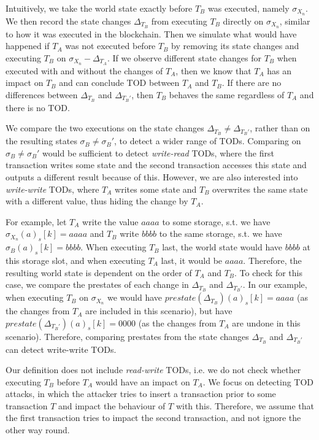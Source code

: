 \documentclass[draft,final]{vutinfth} %
\begin{document}
Intuitively, we take the world state exactly before $T_B$ was executed, namely $\sigma_{X_n}$. We then record the state changes $\Delta_{T_B}$ from executing $T_B$ directly on $\sigma_{X_n}$, similar to how it was executed in the blockchain. Then we simulate what would have happened if $T_A$ was not executed before $T_B$ by removing its state changes and executing $T_B$ on $\sigma_{X_n} - \Delta_{T_A}$. If we observe different state changes for $T_B$ when executed with and without the changes of $T_A$, then we know that $T_A$ has an impact on $T_B$ and can conclude TOD between $T_A$ and $T_B$. If there are no differences between $\Delta_{T_B}$ and $\Delta_{T_B\prime}$, then $T_B$ behaves the same regardless of $T_A$ and there is no TOD.

We compare the two executions on the state changes $\Delta_{T_B} \neq \Delta_{T_B\prime}$, rather than on the resulting states $\sigma_B \neq \sigma_B\prime$, to detect a wider range of TODs. Comparing on $\sigma_B \neq \sigma_B\prime$ would be sufficient to detect \emph{write-read} TODs, where the first transaction writes some state and the second transaction accesses this state and outputs a different result because of this. However, we are also interested into \emph{write-write} TODs, where $T_A$ writes some state and $T_B$ overwrites the same state with a different value, thus hiding the change by $T_A$.

For example, let $T_A$ write the value $aaaa$ to some storage, s.t. we have $\sigma_{X_n}(a)_s[k] = aaaa$ and $T_B$ write $bbbb$ to the same storage, s.t. we have $\sigma_B(a)_s[k] = bbbb$. When executing $T_B$ last, the world state would have $bbbb$ at this storage slot, and when executing $T_A$ last, it would be $aaaa$. Therefore, the resulting world state is dependent on the order of $T_A$ and $T_B$. To check for this case, we compare the prestates of each change in $\Delta_{T_B}$ and $\Delta_{T_B\prime}$. In our example, when executing $T_B$ on $\sigma_{X_n}$ we would have $prestate(\Delta_{T_B})(a)_s[k] = aaaa$ (as the changes from $T_A$ are included in this scenario), but have $prestate(\Delta_{T_B\prime})(a)_s[k] = 0000$ (as the changes from $T_A$ are undone in this scenario). Therefore, comparing prestates from the state changes $\Delta_{T_B}$ and $\Delta_{T_B\prime}$ can detect write-write TODs.

Our definition does not include \emph{read-write} TODs, i.e. we do not check whether executing $T_B$ before $T_A$ would have an impact on $T_A$. We focus on detecting TOD attacks, in which the attacker tries to insert a transaction prior to some transaction $T$ and impact the behaviour of $T$ with this. Therefore, we assume that the first transaction tries to impact the second transaction, and not ignore the other way round.
\end{document}
